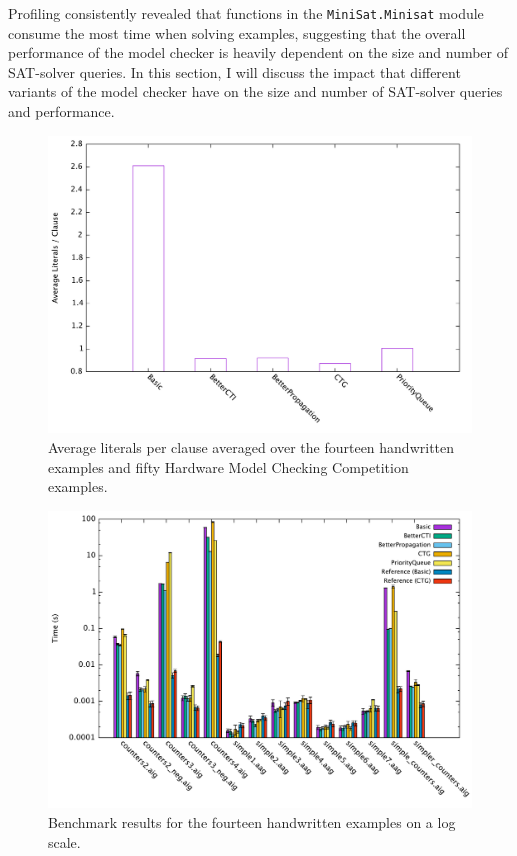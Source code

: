 \documentclass[12pt,a4paper,twoside,openright]{report}
\begin{document}
{Profiling consistently revealed that functions in the \verb,MiniSat.Minisat, module consume the most time
when solving examples, suggesting that the overall performance of the model checker is heavily dependent on
the size and number of SAT-solver queries. In this section, I will discuss the impact that different
variants of the model checker have on the size and number of SAT-solver queries and performance.

\begin{figure}[!ht]
\includegraphics[width=16cm]{litspercls.pdf}
\caption{Average literals per clause averaged over the fourteen handwritten examples and fifty Hardware
Model Checking Competition examples.}
\end{figure}

\begin{figure}[!ht]
\includegraphics[width=16cm]{handwritten.pdf}
\caption{Benchmark results for the fourteen handwritten examples on a log scale.}
\end{figure}

}
\end{document}
